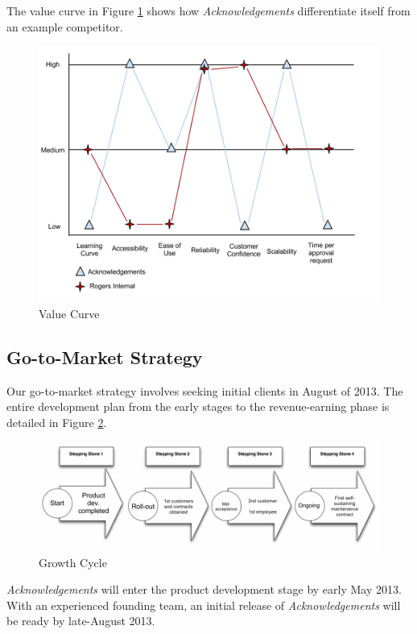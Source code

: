 The value curve in Figure \ref{valuecurve} shows how {\it Acknowledgements} differentiate itself from an example competitor.

\begin{figure}[ht!]
\centering
\includegraphics[width=150mm]{images/MSCI454-ValueCurve.png}
\caption{Value Curve}
\label{valuecurve}
\end{figure}

\subsection{Go-to-Market Strategy}

Our go-to-market strategy involves seeking initial clients in August of 2013. The entire development plan from the early stages to the revenue-earning phase is detailed in Figure \ref{growthCycle}.

\begin{figure}[ht!]
\centering
\includegraphics[width=150mm]{images/MSCI454-SteppingStones.png}
\caption{Growth Cycle}
\label{growthCycle}
\end{figure}

{\it Acknowledgements} will enter the product development stage by early May 2013. With an experienced founding team, an initial release of {\it Acknowledgements} will be ready by late-August 2013.

